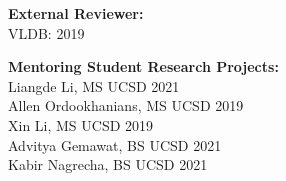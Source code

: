 \documentclass[margin]{res}
\begin{document}
\begin{resume}
\textbf{External Reviewer:}\\
VLDB: 2019

\textbf{Mentoring Student Research Projects:}\\
Liangde Li, MS UCSD 2021\\
Allen Ordookhanians, MS UCSD 2019\\
Xin Li, MS UCSD 2019\\

\vspace{-5mm}
Advitya Gemawat, BS UCSD 2021\\
Kabir Nagrecha, BS UCSD 2021



\end{resume}
\end{document}
